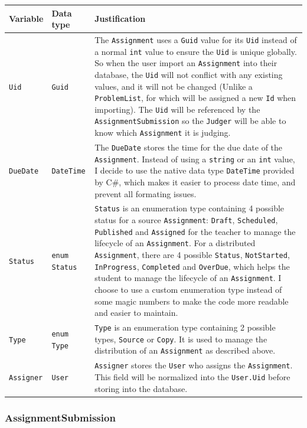 \documentclass[a4paper]{report}
\newcommand{\code}{\texttt}
\begin{document}
\begin{tabulary}{\textwidth}{|l|l|L|}
    \hline
    Variable & Data type & Justification \\
    \hline
    \code{Uid} & \code{Guid} & The \code{Assignment} uses a \code{Guid} value for its \code{Uid} instead of a normal \code{int} value to ensure the \code{Uid} is unique globally. So when the user import an \code{Assignment} into their database, the \code{Uid} will not conflict with any existing values, and it will not be changed (Unlike a \code{ProblemList}, for which will be assigned a new \code{Id} when importing). The \code{Uid} will be referenced by the \code{AssignmentSubmission} so the \code{Judger} will be able to know which \code{Assignment} it is judging. \\
    \hline
    \code{DueDate} & \code{DateTime} & The \code{DueDate} stores the time for the due date of the \code{Assignment}. Instead of using a \code{string} or an \code{int} value, I decide to use the native data type \code{DateTime} provided by C\#, which makes it easier to process date time, and prevent all formating issues. \\
    \hline
    \code{Status} & \code{enum Status} & \code{Status} is an enumeration type containing 4 possible status for a source \code{Assignment}: \code{Draft}, \code{Scheduled}, \code{Published} and \code{Assigned} for the teacher to manage the lifecycle of an \code{Assignment}. For a distributed \code{Assignment}, there are 4 possible \code{Status}, \code{NotStarted}, \code{InProgress}, \code{Completed} and \code{OverDue}, which helps the student to manage the lifecycle of an \code{Assignment}. I choose to use a custom enumeration type instead of some magic numbers to make the code more readable and easier to maintain.\\
    \hline
    \code{Type} & \code{enum Type} & \code{Type} is an enumeration type containing 2 possible types, \code{Source} or \code{Copy}. It is used to manage the distribution of an \code{Assignment} as described above. \\
    \hline
    \code{Assigner} & \code{User} & \code{Assigner} stores the \code{User} who assigns the \code{Assignment}. This field will be normalized into the \code{User.Uid} before storing into the database. \\
    \hline
\end{tabulary}

\subsubsection{AssignmentSubmission}
\end{document}
